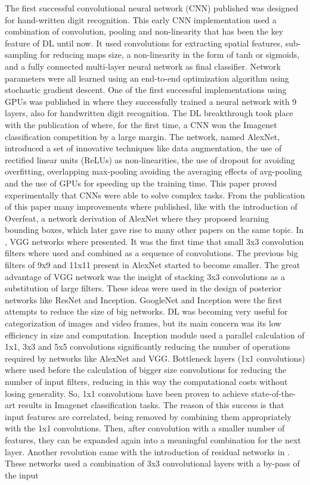 \documentclass[review]{elsarticle}
\theoremstyle{definition} %
\theoremstyle{remark}
\begin{document}
The first successful convolutional neural network (CNN) published \cite{LeCun:98} was designed for hand-written digit recognition. This early CNN implementation used a combination of convolution, pooling and non-linearity that has been the key feature of DL until now. It used convolutions for extracting spatial features, sub-sampling for reducing maps size, a non-linearity in the form of tanh or sigmoids, and a fully connected multi-layer neural network as final classifier.  Network parameters were all learned using an end-to-end optimization algorithm using stochastic gradient descent. One of the first successful implementations using GPUs was published in \cite{ciresan80deep} where they successfully trained a neural network with 9 layers, also for handwritten digit recognition. The DL breakthrough took place with the publication of \cite{NIPS2012_4824} where, for the first time, a CNN won the Imagenet\cite{imagenet_cvpr09} classification competition by a large margin. The network, named AlexNet, introduced a set of innovative techniques like data augmentation, the use of rectified linear units (ReLUs) as non-linearities, the use of dropout for avoiding overfitting, overlapping max-pooling avoiding the averaging effects of avg-pooling and the use of GPUs for speeding up the training time. This paper proved experimentally that CNNs were able to solve complex tasks. From the publication of this paper many improvements where published, like \cite{sermanet2014overfeat} with the introduction of Overfeat, a network derivation of AlexNet where they proposed learning bounding boxes, which later gave rise to many other papers on the same topic. In \cite{vggnet}, VGG networks where presented. It was the first time that small 3x3 convolution filters where used and combined as a sequence of convolutions. The previous big filters of 9x9 and 11x11 present in AlexNet started to become smaller. The great advantage of VGG network was the insight of stacking 3x3 convolutions as a substitution of large filters. These ideas were used in the design of posterior networks like ResNet and Inception. GoogleNet\cite{googlenet} and Inception \cite{szegedy2016rethinking} were the first attempts to reduce the size of big networks. DL was becoming very useful for categorization of images and video frames, but its main concern was its low efficiency in size and computation. Inception module used a parallel calculation of 1x1, 3x3 and 5x5 convolutions significantly reducing the number of operations required by networks like AlexNet and VGG. Bottleneck layers (1x1 convolutions) where used before the calculation of bigger size convolutions for reducing the number of input filters, reducing in this way the computational costs without losing generality. So, 1x1 convolutions have been proven to achieve state-of-the-art results in Imagenet classification tasks. The reason of this success is that input features are correlated, being removed by combining them appropriately with the 1x1 convolutions. Then, after convolution with a smaller number of features, they can be expanded again into a meaningful combination for the next layer. Another revolution came with the introduction of residual networks in \cite{he2016deep}. These networks used a combination of 3x3 convolutional layers with a by-pass of the input 
\end{document}
